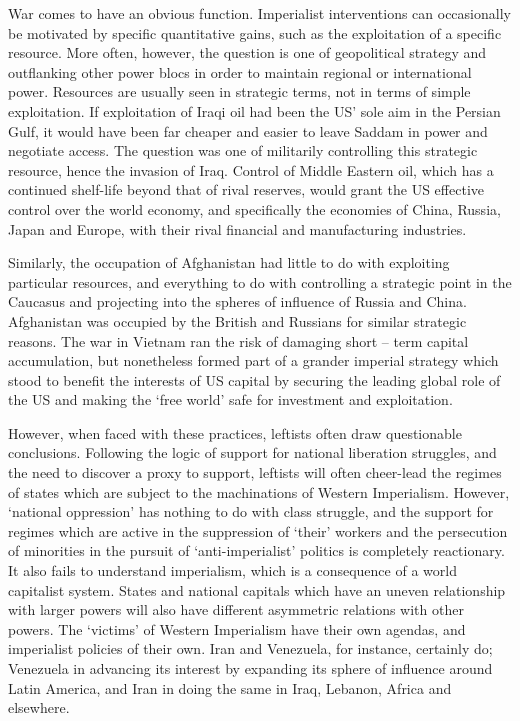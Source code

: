 War comes to have an obvious function. Imperialist interventions can occasionally be motivated by specific quantitative gains, such as the exploitation of a specific resource. More often, however, the question is one of geopolitical strategy and outflanking other power blocs in order to maintain regional or international power. Resources are usually seen in strategic terms, not in terms of simple exploitation. If exploitation of Iraqi oil had been the US’ sole aim in the Persian Gulf, it would have been far cheaper and easier to leave Saddam in power and negotiate access. The question was one of militarily controlling this strategic resource, hence the invasion of Iraq. Control of Middle Eastern oil, which has a continued shelf-life beyond that of rival reserves, would grant the US effective control over the world economy, and specifically the economies of China, Russia, Japan and Europe, with their rival financial and manufacturing industries.

Similarly, the occupation of Afghanistan had little to do with exploiting particular resources, and everything to do with controlling a strategic point in the Caucasus and projecting into the spheres of influence of Russia and China. Afghanistan was occupied by the British and Russians for similar strategic reasons. The war in Vietnam ran the risk of damaging short – term capital accumulation, but nonetheless formed part of a grander imperial strategy which stood to benefit the interests of US capital by securing the leading global role of the US and making the ‘free world’ safe for investment and exploitation.

However, when faced with these practices, leftists often draw questionable conclusions. Following the logic of support for national liberation struggles, and the need to discover a proxy to support, leftists will often cheer-lead the regimes of states which are subject to the machinations of Western Imperialism. However, ‘national oppression’ has nothing to do with class struggle, and the support for regimes which are active in the suppression of ‘their’ workers and the persecution of minorities in the pursuit of ‘anti-imperialist’ politics is completely reactionary. It also fails to understand imperialism, which is a consequence of a world capitalist system. States and national capitals which have an uneven relationship with larger powers will also have different asymmetric relations with other powers. The ‘victims’ of Western Imperialism have their own agendas, and imperialist policies of their own. Iran and Venezuela, for instance, certainly do; Venezuela in advancing its interest by expanding its sphere of influence around Latin America, and Iran in doing the same in Iraq, Lebanon, Africa and elsewhere.

